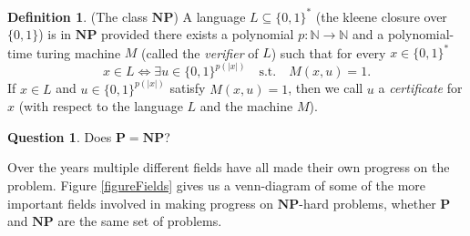 \documentclass[12pt]{amsart}
\theoremstyle{definition}
\newtheorem{definition}{Definition}
\theoremstyle{question}
\newtheorem{question}{Question}
\begin{document}
\begin{onehalfspace}
        \begin{definition}
            (The class $\mathbf{NP}$) A language $L\subseteq\{0,1\}^*$ (the kleene closure over $\{0,1\}$) is in
            $\mathbf{NP}$ provided there exists a polynomial $p:\mathbb{N}\rightarrow\mathbb{N}$ and a polynomial-time
            turing machine $M$ (called the \emph{verifier} of $L$) such that for every $x\in\{0,1\}^*$
            \begin{displaymath}
                x\in L \Leftrightarrow \exists u\in\{0,1\}^{p(|x|)}\quad\text{s.t.}\quad M(x,u)=1.
            \end{displaymath}
            If $x\in L$ and $u\in\{0,1\}^{p(|x|)}$ satisfy $M(x,u)=1$, then we call $u$ a \emph{certificate} for $x$
            (with respect to the language $L$ and the machine $M$).
        \end{definition}

        \begin{question}
            Does $\mathbf{P} = \mathbf{NP}$?
        \end{question}

        Over the years multiple different fields have all made their own progress on the problem.
        Figure \ref{figureFields} gives us a venn-diagram of some of the more important fields involved in
        making progress on $\mathbf{NP}$-hard problems, whether $\mathbf{P}$ and $\mathbf{NP}$ are the same set of problems.

        \begin{figure}
            \centering
\end{figure}
\end{onehalfspace}
\end{document}
